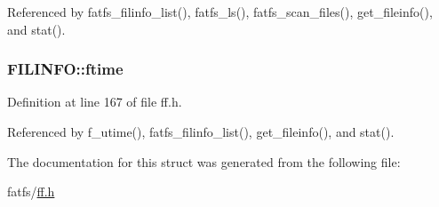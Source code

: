 Referenced by fatfs\-\_\-filinfo\-\_\-list(), fatfs\-\_\-ls(), fatfs\-\_\-scan\-\_\-files(), get\-\_\-fileinfo(), and stat().

\hypertarget{structFILINFO_ae0f751b79621bf7b29669f177bbe6b9a}{
\subsubsection[{ftime}]{ F\-I\-L\-I\-N\-F\-O\-::ftime}}\label{structFILINFO_ae0f751b79621bf7b29669f177bbe6b9a}


Definition at line 167 of file ff.\-h.



Referenced by f\-\_\-utime(), fatfs\-\_\-filinfo\-\_\-list(), get\-\_\-fileinfo(), and stat().



The documentation for this struct was generated from the following file\-:\begin{DoxyCompactItemize}
\item 
fatfs/\hyperlink{ff_8h}{ff.\-h}\end{DoxyCompactItemize}
